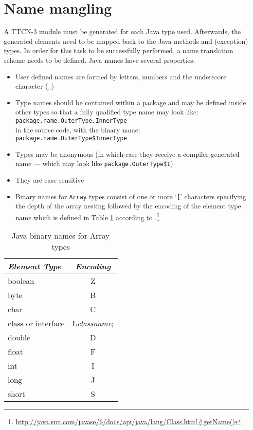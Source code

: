 \section{Name mangling}
\label{sec:name-mangling}

A \ac{TTCN-3} module must be generated for each Java type used.
Afterwards, the generated elements need to be mapped back to
the Java methods and (exception) types.
In order for this task to be successfully performed,
a name translation scheme needs to be defined.
Java names have several properties:

\begin{itemize}
\item User defined names are formed by letters, numbers
and the underscore character (\verb|_|)
\item Type names should be contained within a package
and may be defined inside other types
so that a fully qualified type name may look like:\\
\texttt{package.name.OuterType.InnerType}\\
in the source code, with the binary name:\\
\texttt{package.name.OuterType\$InnerType}
\item Types may be anonymous
(in which case they receive a compiler-generated name ---
which may look like \verb=package.OuterType$1=)
\item They are case sensitive
\item Binary names for \verb=Array= types consist of
one or more `\verb=[=' characters specifying the depth of the array nesting
followed by the encoding of the element type name which is defined in
Table \ref{tab:array-binary-names}
according to \citep{website:java-api}.\footnote{%
\url{http://java.sun.com/javase/6/docs/api/java/lang/Class.html\#getName()}}
\end{itemize}

\begin{table}
\centering
\begin{tabular}{|l || c|}
	\hline
	\emph{Element Type}	& \emph{Encoding} \\
	\hline
	boolean			& Z \\
	byte			& B \\
	char			& C \\
	class or interface	& L\emph{classname}; \\
	double			& D \\
	float			& F \\
	int			& I \\
	long			& J \\
	short			& S \\
	\hline
\end{tabular}
\caption{Java binary names for Array types\label{tab:array-binary-names}}
\end{table}

